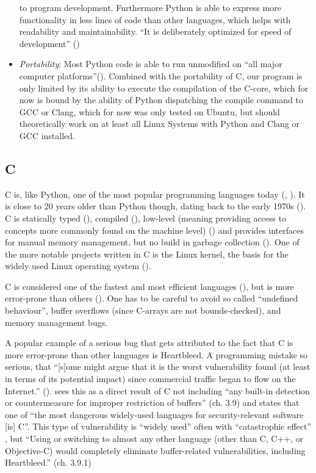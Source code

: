 \begin{itemize}
  to program development. Furthermore Python is able to express more
  functionality in less lines of code than other languages, which helps
  with readability and maintainability. ``It is deliberately optimized
  for speed of development'' (\cite[p. 5]{learningpython})
\item
  \emph{Portability}: Most Python code is able to run unmodified on
  ``all major computer platforms''(\cite[p. 4, 17-18]{learningpython}). Combined
  with the portability of C, our program is only limited by its ability
  to execute the compilation of the C-core, which for now is bound by
  the ability of Python dispatching the compile command to GCC or Clang,
  which for now was only tested on Ubuntu, but should theoretically work
  on at least all Linux Systems with Python and Clang or GCC installed.
\end{itemize}

\hypertarget{c}{%
\subsection{C}\label{c}}

C is, like Python, one of the most popular programming languages today
(\cite{instack}, \cite{octgit}). It is close to 20 years older than Python though,
dating back to the early 1970s (\cite[p. 2]{cmodern}). C is statically typed
(\cite[p. 40]{modernc}), compiled (\cite[p. 2]{cmodern}), low-level (meaning providing
access to concepts more commonly found on the machine level) (\cite[p. 4]{cmodern}) and provides interfaces for manual memory management, but no build in
garbage collection (\cite[p. 55]{cpointers}). One of the more notable projects
written in C is the Linux kernel, the basis for the widely used Linux
operating system (\cite{kernel}).

C is considered one of the fastest and most efficient languages
(\cite{benchmarkgame}), but is
more error-prone than others (\cite[p. 5]{modernc}). One has to be careful to avoid
so called ``undefined behaviour'', buffer overflows (since C-arrays are
not bounds-checked), and memory management bugs.

A popular example of a serious bug that gets attributed to the fact that
C is more error-prone than other languages is Heartbleed. A programming
mistake so serious, that ``[s]ome might argue that it is the worst
vulnerability found (at least in terms of its potential impact) since
commercial traffic began to flow on the Internet.'' (\cite{forbes}).
\cite{wheeler} sees this as a
direct result of C not including ``any built-in detection or
countermeasure for improper restriction of buffers'' (ch. 3.9) and
states that one of ``the most dangerous widely-used languages for
security-relevant software [is] C''. This type of vulnerability is
``widely used'' often with ``catastrophic effect'' , but ``Using or
switching to almost any other language (other than C, C++, or
Objective-C) would completely eliminate buffer-related vulnerabilities,
including Heartbleed.'' (ch. 3.9.1)

